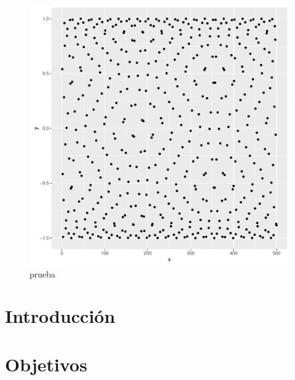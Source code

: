 \documentclass[a4paper,11pt]{book}\usepackage[]{graphicx}\usepackage[]{color}
\makeatletter
\def\maxwidth{ %
  \ifdim\Gin@nat@width>\linewidth
    \linewidth
  \else
    \Gin@nat@width
  \fi
}
\newenvironment{knitrout}{}{} %
\makeatother
\begin{document}
%
%
\tableofcontents
%



\begin{knitrout}
\color{fgcolor}\begin{figure}

{\centering \includegraphics[width=\maxwidth]{figure/prueba-1} 

}

\caption[prueba]{prueba}\label{fig:prueba}
\end{figure}


\end{knitrout}



\chapter{Introducción}


\chapter{Objetivos} 
\end{document}
